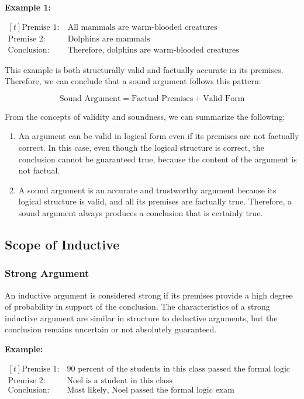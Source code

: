 \documentclass[12pt,a4paper,openany]{article}
\begin{document}
\textbf{Example 1:}

\noindent
\(
\begin{aligned}[t]
\text{Premise 1:} \ & \text{All mammals are warm-blooded creatures} \\
\text{Premise 2:} \ & \text{Dolphins are mammals} \\
\text{Conclusion:} \ & \text{Therefore, dolphins are warm-blooded creatures}
\end{aligned}
\)

This example is both structurally valid and factually accurate in its
premises. Therefore, we can conclude that a sound argument follows this
pattern:

\[
\text{Sound Argument} = \text{Factual Premises} + \text{Valid Form}
\]

From the concepts of validity and soundness, we can summarize the
following:

\begin{enumerate}
\item
An argument can be valid in logical form even if its premises are not
factually correct. In this case, even though the logical structure is
correct, the conclusion cannot be guaranteed true, because the content
of the argument is not factual.
\item
A sound argument is an accurate and trustworthy argument because its
logical structure is valid, and all its premises are factually true.
Therefore, a sound argument always produces a conclusion that is
certainly true.
\end{enumerate}

\subsection{Scope of Inductive}\label{scope-of-inductive}

\subsubsection{Strong Argument}\label{strong-argument}

An inductive argument is considered strong if its premises provide a
high degree of probability in support of the conclusion. The
characteristics of a strong inductive argument are similar in structure
to deductive arguments, but the conclusion remains uncertain or not
absolutely guaranteed.

\textbf{Example:}

\noindent
\(
\begin{aligned}[t]
\text{Premise 1:} \ & \text{90 percent of the students in this class passed the formal logic exam} \\
\text{Premise 2:} \ & \text{Noel is a student in this class} \\
\text{Conclusion:} \ & \text{Most likely, Noel passed the formal logic exam}
\end{aligned}
\)
\end{document}
